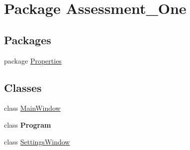 \hypertarget{namespace_assessment___one}{
\section{Package Assessment\_\-One}
\label{namespace_assessment___one}
}
\subsection*{Packages}
\begin{DoxyCompactItemize}
\item 
package \hyperlink{namespace_assessment___one_1_1_properties}{Properties}
\end{DoxyCompactItemize}
\subsection*{Classes}
\begin{DoxyCompactItemize}
\item 
class \hyperlink{class_assessment___one_1_1_main_window}{MainWindow}
\item 
class {\bfseries Program}
\item 
class \hyperlink{class_assessment___one_1_1_settings_window}{SettingsWindow}
\end{DoxyCompactItemize}
